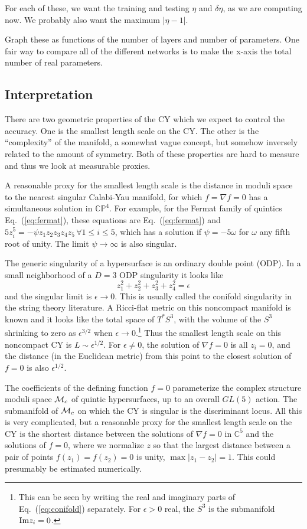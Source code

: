 \documentclass[12pt]{article}
\def\IC{\mathbb{C}}
\def\IP{\mathbb{P}}
\def\CM {{\cal M}}
\newcommand{\eq}[1]{Eq.~(\ref{eq:#1})}
\newcommand{\be}{\begin{equation}}
\newcommand{\ee}{\end{equation}}
\renewcommand{\Im}{{\rm Im }}
\begin{document}
For each of these, we want the training and testing $\eta$ and $\delta\eta$, as we are computing now.
We probably also want the maximum $|\eta-1|$.

Graph these as functions of the number of layers and number of parameters.
One fair way to compare all of the different networks is to make the x-axis the total number of real parameters.

\subsection{ Interpretation }

There are two geometric properties of the CY which we expect to control the accuracy.
One is the smallest length scale on the CY.  The other is the ``complexity'' of the manifold,
a somewhat vague concept, but somehow inversely related to the amount of symmetry.
Both of these properties are hard to measure and thus we look at measurable proxies.

A reasonable proxy for the smallest length scale is the distance in moduli space to the nearest
singular Calabi-Yau manifold, for which $f=\nabla f=0$ has a simultaneous solution in $\IC\IP^4$.
For example, for the Fermat family of quintics \eq{fermat}, these equations are \eq{fermat} and
$ 5 z_i^5 = - \psi z_1z_2z_3z_4z_5 \, \forall 1\le i\le 5$, which has a solution if $\psi=-5\omega$
for $\omega$ any fifth root of unity.  The limit $\psi\rightarrow\infty$ is also singular.

The generic singularity of a hypersurface is an ordinary double point (ODP).  In a small neighborhood
of a $D=3$ ODP singularity it looks like
\be\label{eq:conifold}
z_1^2 + z_2^2 + z_3^2 + z_4^2 = \epsilon
\ee
and the singular limit is $\epsilon\rightarrow 0$.  This is usually called the conifold singularity in the
string theory literature.  A Ricci-flat metric on this noncompact manifold is known \cite{Candelas1990}
and it looks like the total space of $T^*S^3$, with the volume of the $S^3$ shrinking to zero as $\epsilon^{3/2}$
when $\epsilon\rightarrow 0$.\footnote{This can be seen by writing the real and imaginary parts of
\eq{conifold} separately.  For $\epsilon>0$ real, the $S^3$ is the submanifold $\Im z_i=0$.}
Thus the smallest length scale on this noncompact CY is $L \sim \epsilon^{1/2}$.
For $\epsilon\ne 0$, the solution of $\nabla f=0$ is all $z_i=0$, and the distance (in the Euclidean metric)
from this point to the closest solution of $f=0$ is also $\epsilon^{1/2}$.  

The coefficients of the defining function $f=0$ parameterize the complex structure moduli space $\CM_c$ of quintic
hypersurfaces, up to an overall $GL(5)$ action.  The submanifold of $\CM_c$ on which the CY is singular
is the discriminant locus.  All this is very complicated, but a reasonable proxy for the smallest length scale
on the CY is the shortest distance between the solutions of $\nabla f=0$ in $\IC^5$ and the solutions of $f=0$,
where we normalize $z$ so that the largest distance between a pair of points $f(z_1)=f(z_2)=0$ is unity,
$\max |z_1-z_2|=1$.  This could presumably be estimated numerically.
\end{document}
